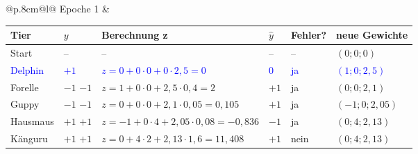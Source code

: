 \noindent\begin{tabular}{@{}p{.8cm}@{}l@{}}
\hspace{-0.5cm}\tiny{Epoche 1} &
\begin{tabular}{|>{\centering\arraybackslash}p{1.7cm}|>{\centering\arraybackslash}p{0.8cm}|p{6cm}|>{\centering\arraybackslash}p{0.8cm}|>{\centering\arraybackslash}p{1.2cm}|>{\centering\arraybackslash}p{2.4cm}|}
\hline
Tier & $y$ & Berechnung z & $\hat y$ & \small{Fehler?} & \small{neue Gewichte} \\
\hline
Start & -- & -- & -- & -- & $(0; 0; 0)$ \\
\hline
\textcolor{blue}{Delphin} & \textcolor{blue}{$+1$} & \textcolor{blue}{$z = 0 + 0\cdot0 + 0\cdot2{,}5 = 0$} & \textcolor{blue}{$0$} & \textcolor{blue}{ja} & \textcolor{blue}{$(1;0;2{,}5)$} \\[8pt]
\hline
Forelle & \ifdefined\zeigloesungen \textcolor{loesgruen}{$-1$} \else $-1$ \fi & \ifdefined\zeigloesungen \textcolor{loesgruen}{$z = 1 + 0\cdot0 + 2{,}5\cdot0{,}4 = 2$} \fi & \ifdefined\zeigloesungen \textcolor{loesgruen}{$+1$} \fi & \ifdefined\zeigloesungen \textcolor{loesgruen}{ja} \fi & \ifdefined\zeigloesungen \textcolor{loesgruen}{$(0;0;2{,}1)$} \fi \\[8pt]
\hline
Guppy & \ifdefined\zeigloesungen \textcolor{loesgruen}{$-1$} \else $-1$ \fi & \ifdefined\zeigloesungen \textcolor{loesgruen}{$z = 0 + 0\cdot0 + 2{,}1\cdot0{,}05 = 0{,}105$} \fi & \ifdefined\zeigloesungen \textcolor{loesgruen}{$+1$} \fi & \ifdefined\zeigloesungen \textcolor{loesgruen}{ja} \fi & \ifdefined\zeigloesungen \textcolor{loesgruen}{$(-1;0;2{,}05)$} \fi \\[8pt]
\hline
Hausmaus & \ifdefined\zeigloesungen \textcolor{loesgruen}{$+1$} \else $+1$ \fi & \ifdefined\zeigloesungen \textcolor{loesgruen}{$z = {-1} + 0\cdot4 + 2{,}05\cdot0{,}08 = {-0{,}836}$} \fi & \ifdefined\zeigloesungen \textcolor{loesgruen}{$-1$} \fi & \ifdefined\zeigloesungen \textcolor{loesgruen}{ja} \fi & \ifdefined\zeigloesungen \textcolor{loesgruen}{$(0;4;2{,}13)$} \fi \\[8pt]
\hline
Känguru & \ifdefined\zeigloesungen \textcolor{loesgruen}{$+1$} \else $+1$ \fi & \ifdefined\zeigloesungen \textcolor{loesgruen}{$z = 0 + 4\cdot2 + 2{,}13\cdot1{,}6 = 11{,}408$} \fi & \ifdefined\zeigloesungen \textcolor{loesgruen}{$+1$} \fi & \ifdefined\zeigloesungen \textcolor{loesgruen}{nein} \fi & \ifdefined\zeigloesungen \textcolor{loesgruen}{$(0;4;2{,}13)$} \fi \\[8pt]
\hline
\end{tabular}
\end{tabular}
\medskip

